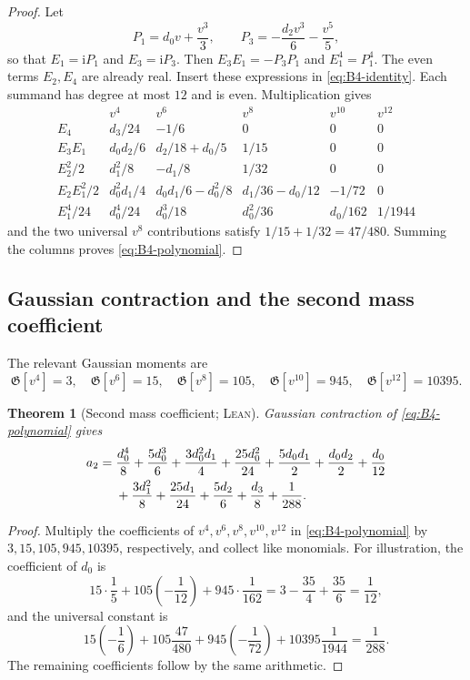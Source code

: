 \documentclass[11pt,oneside]{article}
\newtheorem{theorem}{Theorem}[section]
\theoremstyle{definition}
\theoremstyle{remark}
\newcommand{\ii}{\mathrm i}
\newcommand{\Gauss}{\mathfrak G}
\newcommand{\Formalized}{\textsc{Lean}}
\begin{document}
\begin{proof}
Let
\[
 P_1=d_0v+\frac{v^3}{3},\qquad
 P_3=-\frac{d_2v^3}{6}-\frac{v^5}{5},
\]
so that $E_1=\ii P_1$ and $E_3=\ii P_3$.  Then
$E_3E_1=-P_3P_1$ and $E_1^4=P_1^4$.  The even terms $E_2,E_4$ are already
real.  Insert these expressions in \eqref{eq:B4-identity}.  Each summand
has degree at most $12$ and is even.  Multiplication gives
\[
\begin{array}{c|ccccc}
 &v^4&v^6&v^8&v^{10}&v^{12}\\
\hline
E_4&
 d_3/24&-1/6&0&0&0\\
E_3E_1&
 d_0d_2/6&d_2/18+d_0/5&1/15&0&0\\
E_2^2/2&
 d_1^2/8&-d_1/8&1/32&0&0\\
E_2E_1^2/2&
 d_0^2d_1/4&
 d_0d_1/6-d_0^2/8&
 d_1/36-d_0/12&
 -1/72&0\\
E_1^4/24&
 d_0^4/24&d_0^3/18&d_0^2/36&d_0/162&1/1944
\end{array}
\]
and the two universal $v^8$ contributions satisfy
$1/15+1/32=47/480$.  Summing the columns proves
\eqref{eq:B4-polynomial}.
\end{proof}

\subsection{Gaussian contraction and the second mass coefficient}

The relevant Gaussian moments are
\[
 \Gauss[v^4]=3,\quad
 \Gauss[v^6]=15,\quad
 \Gauss[v^8]=105,\quad
 \Gauss[v^{10}]=945,\quad
 \Gauss[v^{12}]=10395.
\]

\begin{theorem}[Second mass coefficient; \Formalized]
\label{thm:a2}
Gaussian contraction of \eqref{eq:B4-polynomial} gives
\begin{align}
 a_2={}&
 \frac{d_0^4}{8}+\frac{5d_0^3}{6}
 +\frac{3d_0^2d_1}{4}+\frac{25d_0^2}{24}
 +\frac{5d_0d_1}{2}+\frac{d_0d_2}{2}
 +\frac{d_0}{12} \notag\\
 &+\frac{3d_1^2}{8}+\frac{25d_1}{24}
 +\frac{5d_2}{6}+\frac{d_3}{8}
 +\frac1{288}. \label{eq:a2}
\end{align}
\end{theorem}

\begin{proof}
Multiply the coefficients of $v^4,v^6,v^8,v^{10},v^{12}$ in
\eqref{eq:B4-polynomial} by $3,15,105,945,10395$, respectively, and
collect like monomials.  For illustration, the coefficient of $d_0$ is
\[
 15\cdot\frac15
 +105\left(-\frac1{12}\right)
 +945\cdot\frac1{162}
 =3-\frac{35}{4}+\frac{35}{6}
 =\frac1{12},
\]
and the universal constant is
\[
 15\left(-\frac16\right)
 +105\frac{47}{480}
 +945\left(-\frac1{72}\right)
 +10395\frac1{1944}
 =\frac1{288}.
\]
The remaining coefficients follow by the same arithmetic.
\end{proof}
\end{document}
